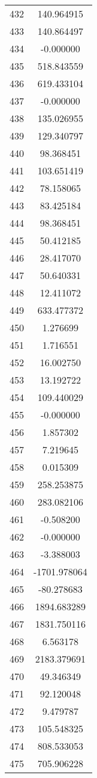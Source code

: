 \documentclass[12pt]{article}
\begin{document}
\begin{longtable}{@{}cc@{}}
432 & 140.964915 \\
433 & 140.864497 \\
434 & -0.000000 \\
435 & 518.843559 \\
436 & 619.433104 \\
437 & -0.000000 \\
438 & 135.026955 \\
439 & 129.340797 \\
440 & 98.368451 \\
441 & 103.651419 \\
442 & 78.158065 \\
443 & 83.425184 \\
444 & 98.368451 \\
445 & 50.412185 \\
446 & 28.417070 \\
447 & 50.640331 \\
448 & 12.411072 \\
449 & 633.477372 \\
450 & 1.276699 \\
451 & 1.716551 \\
452 & 16.002750 \\
453 & 13.192722 \\
454 & 109.440029 \\
455 & -0.000000 \\
456 & 1.857302 \\
457 & 7.219645 \\
458 & 0.015309 \\
459 & 258.253875 \\
460 & 283.082106 \\
461 & -0.508200 \\
462 & -0.000000 \\
463 & -3.388003 \\
464 & -1701.978064 \\
465 & -80.278683 \\
466 & 1894.683289 \\
467 & 1831.750116 \\
468 & 6.563178 \\
469 & 2183.379691 \\
470 & 49.346349 \\
471 & 92.120048 \\
472 & 9.479787 \\
473 & 105.548325 \\
474 & 808.533053 \\
475 & 705.906228 \\

\end{longtable}
\end{document}
